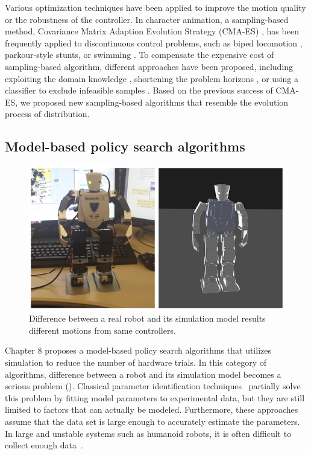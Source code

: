 Various optimization techniques have been applied to improve the
motion quality or the robustness of the controller.  In character
animation, a sampling-based method, Covariance Matrix Adaption
Evolution Strategy (CMA-ES) \cite{Hansen:2004:CMA}, has been
frequently applied to discontinuous control problems, such as biped
locomotion \cite{Wang:2009:OWC,Wang:2010:OWC,Wang:2012:OLC},
parkour-style stunts\cite{Liu:2012:TRC,Ha:2014:ITD}, or swimming
\cite{Tan:2011:ASC}.  To compensate the expensive cost of
sampling-based algorithm, different approaches have been proposed,
including exploiting the domain knowledge
\cite{Wang:2009:OWC,Wang:2010:OWC,Wang:2012:OLC}, shortening the
problem horizons \cite{Sok:2007:SBB}, or using a classifier to exclude
infeasible samples \cite{Ha:2014:ITD}. Based on the previous success
of CMA-ES, we proposed new sampling-based algorithms that resemble the
evolution process of distribution.

\subsection{Model-based policy search algorithms}
\begin{figure}[htbp]
\center
  \includegraphics[width=0.9\linewidth]{images/related_robovies.png}
  \caption{Difference between a real robot and its simulation model
  results different motions from same controllers.}
 \label{fig:related_robovies}
\end{figure}

Chapter 8 proposes a model-based policy search algorithms that
utilizes simulation to reduce the number of hardware trials.
In this category of algorithms,
difference between a robot and its simulation model becomes a serious 
problem  ().
Classical parameter identification
techniques~\cite{bib-khalil-identification} partially solve this
problem by fitting model parameters to experimental data, but they
are still limited to factors that can actually be modeled. 
Furthermore, these approaches assume that the data set is large enough
to accurately estimate the parameters.
In large and unstable systems such as humanoid robots, it is often
difficult to collect enough data~\cite{bib-humanoids2011-calibration}.

